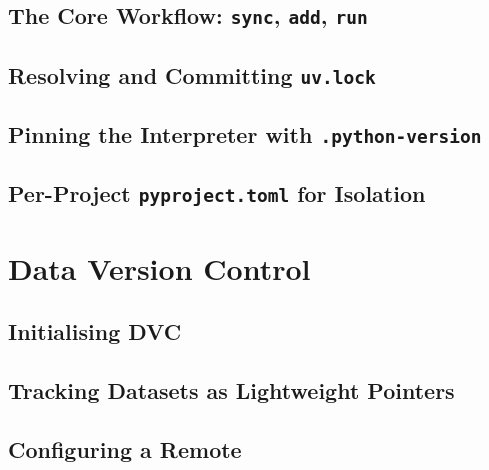 \subsection{The Core Workflow: \texttt{sync}, \texttt{add}, \texttt{run}}

\subsection{Resolving and Committing \texttt{uv.lock}}


\subsection{Pinning the Interpreter with \texttt{.python-version}}

\subsection{Per-Project \texttt{pyproject.toml} for Isolation}


\section{Data Version Control}
\label{sec:dvc}

\subsection{Initialising DVC}

\subsection{Tracking Datasets as Lightweight Pointers}

\subsection{Configuring a Remote}

